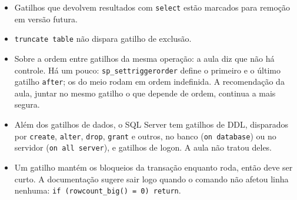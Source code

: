 \begin{itemize}
	\item Gatilhos que devolvem resultados com \texttt{select} estão
	marcados para remoção em versão futura.
	\item \texttt{truncate table} não dispara gatilho de exclusão.
	\item Sobre a ordem entre gatilhos da mesma operação: a aula diz que
	não há controle. Há um pouco: \texttt{sp\_settriggerorder} define o
	primeiro e o último gatilho \texttt{after}; os do meio rodam em
	ordem indefinida. A recomendação da aula, juntar no mesmo gatilho o
	que depende de ordem, continua a mais segura.
	\item Além dos gatilhos de dados, o SQL Server tem gatilhos de DDL,
	disparados por \texttt{create}, \texttt{alter}, \texttt{drop},
	\texttt{grant} e outros, no banco (\texttt{on database}) ou no
	servidor (\texttt{on all server}), e gatilhos de logon. A aula não
	tratou deles.
	\item Um gatilho mantém os bloqueios da transação enquanto roda, então
	deve ser curto. A documentação sugere sair logo quando o comando não
	afetou linha nenhuma: \texttt{if (rowcount\_big() = 0) return}.
\end{itemize}
